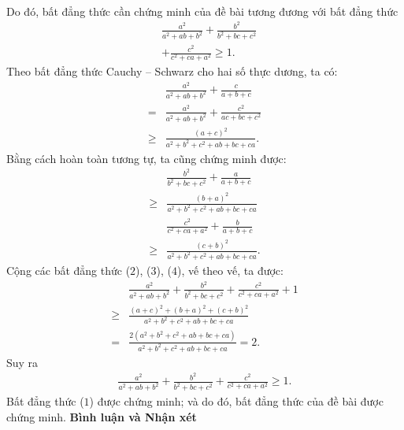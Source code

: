 \begin{multicols}{2}
\begin{align*}
	\end{align*}
	Do đó, bất đẳng thức cần chứng minh của đề bài tương đương với bất đẳng thức
	\begin{align*}
		&\frac{{{a^2}}}{{{a^2} + ab + {b^2}}} + \frac{{{b^2}}}{{{b^2} + bc + {c^2}}} \\
		&+ \frac{{{c^2}}}{{{c^2} + ca + {a^2}}} \ge 1. \tag{$1$}
	\end{align*}
	Theo bất đẳng thức Cauchy -- Schwarz cho hai số thực dương, ta có:
	\begin{align*}
		&\frac{{{a^2}}}{{{a^2} + ab + {b^2}}} + \frac{c}{{a + b + c}} \\
		= &\frac{{{a^2}}}{{{a^2} + ab + {b^2}}} + \frac{{{c^2}}}{{ac + bc + {c^2}}} \\
		\ge &\frac{{{{\left( {a + c} \right)}^2}}}{{{a^2} + {b^2} + {c^2} + ab + bc + ca}}. \tag{$2$}
	\end{align*}
	Bằng cách hoàn toàn tương tự, ta cũng chứng minh được:
	\begin{align*}
		&\frac{{{b^2}}}{{{b^2} + bc + {c^2}}} + \frac{a}{{a + b + c}} \\
		\ge &\frac{{{{\left( {b + a} \right)}^2}}}{{{a^2} + {b^2} + {c^2} + ab + bc + ca}} \tag{$3$}\\
		&\frac{{{c^2}}}{{{c^2} + ca + {a^2}}} + \frac{b}{{a + b + c}} \\
		\ge &\frac{{{{\left( {c + b} \right)}^2}}}{{{a^2} + {b^2} + {c^2} + ab + bc + ca}}. \tag{$4$}
	\end{align*}
	Cộng các bất đẳng thức ($2$), ($3$), ($4$), vế theo vế, ta được:
	\begin{align*}
			&\frac{{{a^2}}}{{{a^2}\!\!+\! ab \!+\! {b^2}}} \!+\! \frac{{{b^2}}}{{{b^2} \!\!+\! bc \!+\! {c^2}}} \!+\! \frac{{{c^2}}}{{{c^2} \!\!+\! ca \!+\! {a^2}}} \!+\! 1\\
			\ge &\frac{{{{\left( {a + c} \right)}^2} + {{\left( {b + a} \right)}^2} + {{\left( {c + b} \right)}^2}}}{{{a^2} + {b^2} + {c^2} + ab + bc + ca}}\\
			= &\frac{{2\left( {{a^2} + {b^2} + {c^2} + ab + bc + ca} \right)}}{{{a^2} + {b^2} + {c^2} + ab + bc + ca}} = 2.
	\end{align*}
	Suy ra
	\begin{align*}
		\frac{{{a^2}}}{{{a^2} + ab + {b^2}}} + \frac{{{b^2}}}{{{b^2} + bc + {c^2}}} + \frac{{{c^2}}}{{{c^2} + ca + {a^2}}} \ge 1.
	\end{align*}
	Bất đẳng thức ($1$) được chứng minh; và do đó, bất đẳng thức của đề bài được chứng minh.
	\vskip 0.05cm
	\textbf{\color{thachthuctoanhoc}Bình luận và Nhận xét}

\end{multicols}
